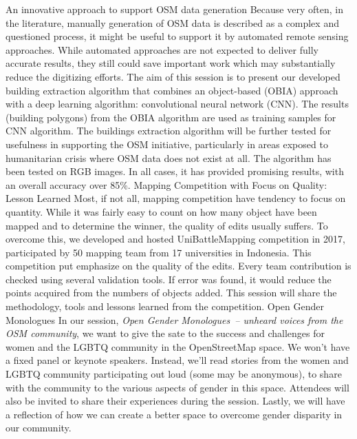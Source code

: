%
{An innovative approach to support OSM data generation }%
{}%
{%
  Because very often, in the literature, manually generation of OSM data is described as a complex
  and questioned process, it might be useful to support it by automated remote sensing approaches.
  While automated approaches are not expected to deliver fully accurate results, they still could
  save important work which may substantially reduce the digitizing efforts. The aim of this session
  is to present our developed building extraction algorithm that combines an object-based (OBIA)
  approach with a deep learning algorithm: convolutional neural network (CNN). The results (building
  polygons) from the OBIA algorithm are used as training samples for CNN algorithm. The buildings
  extraction algorithm will be further tested for usefulness in supporting the OSM initiative,
  particularly in areas exposed to humanitarian crisis where OSM data does not exist at all. The
  algorithm has been tested on RGB images. In all cases, it has provided promising results, with an
  overall accuracy over 85\%.%
}
%
{Mapping Competition with Focus on Quality: Lesson Learned}%
{}%
{%
  Most, if not all, mapping competition have tendency to focus on quantity. While it was fairly easy
  to count on how many object have been mapped and to determine the winner, the quality of edits
  usually suffers. To overcome this, we developed and hosted UniBattleMapping competition in 2017,
  participated by 50 mapping team from 17 universities in Indonesia. This competition put emphasize
  on the quality of the edits. Every team contribution is checked using several validation tools. If
  error was found, it would reduce the points acquired from the numbers of objects added. This
  session will share the methodology, tools and lessons learned from the competition.%
}
%
{Open Gender Monologues}%
{}%
{%
  In our session, \emph{Open Gender Monologues~-- unheard voices from the OSM community}, we want to
  give the sate to the success and challenges for women and the LGBTQ community in the OpenStreetMap
  space. We won't have a fixed panel or keynote speakers. Instead, we'll read stories from the women
  and LGBTQ community participating out loud (some may be anonymous), to share with the community to
  the various aspects of gender in this space. Attendees will also be invited to share their
  experiences during the session. Lastly, we will have a reflection of how we can create a better
  space to overcome gender disparity in our community.%
}

